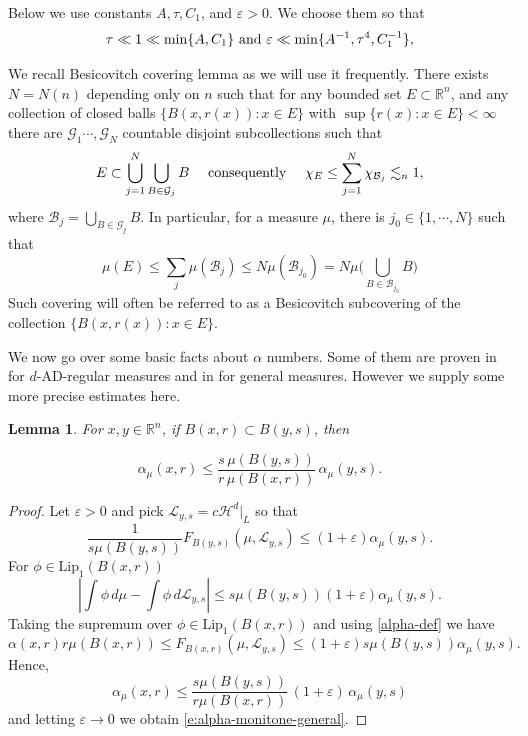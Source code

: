 \documentclass[11pt]{amsart}
\newcommand{\R}{{\mathbb R}}       %
\newcommand{\HH}{{\mathcal H}}
\newcommand{\LL}{{\mathcal L}}
\newcommand{\ve}{{\varepsilon}}
\newtheorem{lemma}[theorem]{Lemma}
\theoremstyle{definition}
\theoremstyle{remark}
\numberwithin{equation}{section}
\newcommand{\av}[1]{\left| #1 \right|}
\def\lec{\lesssim}
\def\lec{\lesssim}
\def\Lip{\textrm{Lip}}
\begin{document}
Below we use constants $A,\tau,C_{1}$, and $\ve>0$. We choose them so that 
\begin{equation}\label{constants-1}
\tau\ll1\ll \min\{A,C_1\}\hbox{      and      }
\ve\ll\min\{A^{-1},\tau^4,C_{1}^{-1}\},
\end{equation}

We recall  Besicovitch covering lemma as we will use it frequently. There exists $N=N(n)$ depending only on $n$ such that for any bounded set $E\subset \R^n$, and any collection of closed balls 
$\{B(x,r(x)): x\in E\}$ with $\sup\{r(x):x\in E\}<\infty$ there are 
$\mathcal G_1\cdots, \mathcal G_N$ countable disjoint subcollections 
 such that
\begin{equation}\label{besicovitch-1}
E\subset \bigcup_{j=1}^N\bigcup_{B\in \mathcal G_j}B \quad\hbox{   consequently   }\quad
\chi_{E}\leq \sum_{j=1}^N \chi_{\mathcal B_j}\lec_{n} 1,
\end{equation}
where $\mathcal B_j=\bigcup_{B\in\mathcal G_j}B$.
In particular, for a measure $\mu$, there is $j_0\in\{1,\cdots, N\}$ such that 
\begin{equation}\label{e:besicovitch}
\mu(E) \leq \sum_{j}\mu(\mathcal B_{j}) \le N \mu( \mathcal B_{j_0})= N \mu\biggl(\bigcup_{B\in \mathcal B_{j_0}}B\biggr)
\end{equation}
Such covering will often be referred to as a Besicovitch subcovering of the collection $\{B(x,r(x)): x\in E\}$.


We now go over some basic facts about $\alpha$ numbers. Some of them are proven in \cite{Tol09} for $d$-AD-regular measures and in \cite{Tol17} for general measures. However we supply some more precise estimates here. 


\begin{lemma}\label{l:alpha-monitone}
	For $x,y\in \R^{n}$, if $B(x,r)\subset B(y,s)$, then
	
	\begin{equation}\label{e:alpha-monitone-general}
	\alpha_{\mu}(x,r)\leq  \frac{s\,\mu(B(y,s))}{r\,\mu(B(x,r))}\,\alpha_{\mu}(y,s).
	\end{equation}
\end{lemma}

\begin{proof}
	Let  $\ve>0$ and pick $\LL_{y,s}=c\HH^{d}|_{L}$ so that 
	\[
	\frac{1}{s\mu(B(y,s))}F_{B(y,s)}(\mu,\LL_{y,s})\leq(1+\ve)\alpha_{\mu}(y,s).
	\]
	For $\phi\in \Lip_{1}(B(x,r))$
	\[ 
	\av{\int\phi \,d\mu - \int \phi\, d\LL_{y,s}}
	\leq s\mu(B(y,s)) (1+\ve)\alpha_{\mu}(y,s).
	\]
	Taking the supremum over $\phi\in \Lip_{1}(B(x,r))$ and using \eqref{alpha-def} we have
	\[
	\alpha(x,r)r\mu(B(x,r))\le F_{B(x,r)}(\mu, \LL_{y,s})\leq(1+\ve)s\mu(B(y,s))\alpha_{\mu}(y,s).
	\]
	Hence,
	\[
	\alpha_{\mu}(x,r) 
	\leq \frac{s\mu(B(y,s))}{r\mu(B(x,r))}\,(1+\ve) \,\alpha_{\mu}(y,s)
	\]
	and letting $\ve\rightarrow 0$ we obtain \eqref{e:alpha-monitone-general}.
\end{proof}
\end{document}
